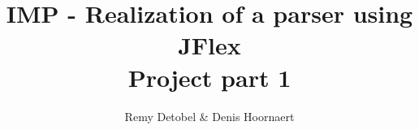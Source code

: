 \documentclass[a4paper,11pt]{report}
\title{IMP - Realization of a parser using JFlex\\Project part 1}
\author{Remy Detobel \& Denis Hoornaert}
\begin{document}
\maketitle
\tableofcontents

\chapter{}
\end{document}
